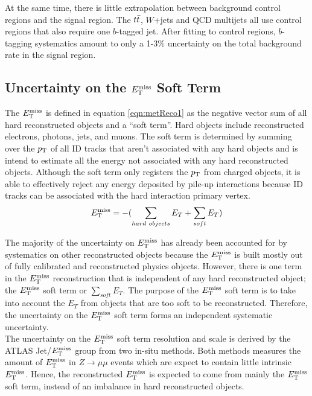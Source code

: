 \indent At the same time, there is little extrapolation between background control regions and the signal region. The $t\bar{t}$, $W$+jets and QCD multijets all use control regions that also require one $b$-tagged jet.  After fitting to control regions, $b$-tagging systematics amount to only a 1-3\% uncertainty on the total background rate in the signal region.  \\

\subsection{Uncertainty on the $E_{\mathrm{T}}^{\mathrm{miss}}$ Soft Term}

\indent The $E_{\mathrm{T}}^{\mathrm{miss}}$ is defined in equation \ref{eqn:metReco1} as the negative vector sum of all hard reconstructed objects and a ``soft term''.  Hard objects include reconstructed electrons, photons, jets, and muons.  The soft term is determined by summing over the $p_{\mathrm{T}}$ of all ID tracks that aren't associated with any hard objects and is intend to estimate all the energy not associated with any hard reconstructed objects.  Although the soft term only registers the $p_{\mathrm{T}}$ from charged objects, it is able to effectively reject any energy deposited by pile-up interactions because ID tracks can be associated with the hard interaction primary vertex. \\

\begin{equation}
E_{\mathrm{T}}^{\mathrm{miss}} = - ( \sum_{hard~objects} E_T + \sum_{soft} E_T ) 
\label{eqn:metReco1}
\end{equation}

\indent  The majority of the uncertainty on $E_{\mathrm{T}}^{\mathrm{miss}}$ has already been accounted for by systematics on other reconstructed objects because the $E_{\mathrm{T}}^{\mathrm{miss}}$ is built mostly out of fully calibrated and reconstructed physics objects.  However, there is one term in the $E_{\mathrm{T}}^{\mathrm{miss}}$ reconstruction that is independent of any hard reconstructed object; the $E_{\mathrm{T}}^{\mathrm{miss}}$ soft term or $\sum_{soft} E_T$.  The purpose of the $E_{\mathrm{T}}^{\mathrm{miss}}$ soft term is to take into account the $E_T$ from objects that are too soft to be reconstructed.  Therefore, the uncertainty on the $E_{\mathrm{T}}^{\mathrm{miss}}$ soft term forms an independent systematic uncertainty.  \\

\indent The uncertainty on the $E_{\mathrm{T}}^{\mathrm{miss}}$ soft term resolution and scale is derived by the ATLAS Jet/$E_{\mathrm{T}}^{\mathrm{miss}}$ group from two in-situ methods.  Both methods measures the amount of $E_{\mathrm{T}}^{\mathrm{miss}}$ in $Z\rightarrow \mu\mu$ events which are expect to contain little intrinsic $E_{\mathrm{T}}^{\mathrm{miss}}$.\cite{METPerform}  Hence, the reconstructed $E_{\mathrm{T}}^{\mathrm{miss}}$ is expected to come from mainly the $E_{\mathrm{T}}^{\mathrm{miss}}$ soft term, instead of an imbalance in hard reconstructed objects.  \\


